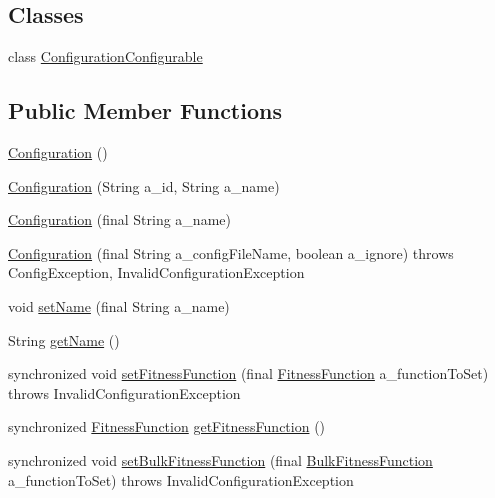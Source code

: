 \subsection*{Classes}
\begin{DoxyCompactItemize}
\item 
class \hyperlink{classorg_1_1jgap_1_1_configuration_1_1_configuration_configurable}{Configuration\-Configurable}
\end{DoxyCompactItemize}
\subsection*{Public Member Functions}
\begin{DoxyCompactItemize}
\item 
\hyperlink{classorg_1_1jgap_1_1_configuration_a7f5436b02b89b8bc04cd71b583bb6941}{Configuration} ()
\item 
\hyperlink{classorg_1_1jgap_1_1_configuration_affaf3aee531043cd0e9f1acb87559c7b}{Configuration} (String a\-\_\-id, String a\-\_\-name)
\item 
\hyperlink{classorg_1_1jgap_1_1_configuration_ac4059e7a472ebabc6a089ba457115a31}{Configuration} (final String a\-\_\-name)
\item 
\hyperlink{classorg_1_1jgap_1_1_configuration_a11360483f8ee0ad13e7af351e9232bce}{Configuration} (final String a\-\_\-config\-File\-Name, boolean a\-\_\-ignore)  throws Config\-Exception, Invalid\-Configuration\-Exception 
\item 
void \hyperlink{classorg_1_1jgap_1_1_configuration_a302e4fa2379bb0d8dd7b7e2706f4744d}{set\-Name} (final String a\-\_\-name)
\item 
String \hyperlink{classorg_1_1jgap_1_1_configuration_a73e10555c4c685fe157511aff23b1da6}{get\-Name} ()
\item 
synchronized void \hyperlink{classorg_1_1jgap_1_1_configuration_a338d4a2941a980eb9c55af5e3fbe69d5}{set\-Fitness\-Function} (final \hyperlink{classorg_1_1jgap_1_1_fitness_function}{Fitness\-Function} a\-\_\-function\-To\-Set)  throws Invalid\-Configuration\-Exception 
\item 
synchronized \hyperlink{classorg_1_1jgap_1_1_fitness_function}{Fitness\-Function} \hyperlink{classorg_1_1jgap_1_1_configuration_ae155e11f3fca53986cee1ff55b18fc32}{get\-Fitness\-Function} ()
\item 
synchronized void \hyperlink{classorg_1_1jgap_1_1_configuration_af9d3ddd0f9263eca0f6ff53442d5a100}{set\-Bulk\-Fitness\-Function} (final \hyperlink{classorg_1_1jgap_1_1_bulk_fitness_function}{Bulk\-Fitness\-Function} a\-\_\-function\-To\-Set)  throws Invalid\-Configuration\-Exception 

\end{DoxyCompactItemize}
